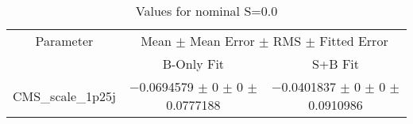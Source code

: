 \begin{table}
\centering
\caption{Values for nominal S=0.0}
\begin{tabular}{ccc}
\toprule
Parameter & \multicolumn{2}{c}{Mean $\pm$ Mean Error $\pm$ RMS $\pm$ Fitted Error}\\
 & B-Only Fit & S+B Fit\\
\midrule
CMS\_scale\_1p25j & \num{-0.0694579} $\pm$ \num{0} $\pm$ \num{0} $\pm$ \num{0.0777188} & \num{-0.0401837} $\pm$ \num{0} $\pm$ \num{0} $\pm$ \num{0.0910986}\\
\bottomrule
\end{tabular}
\end{table}